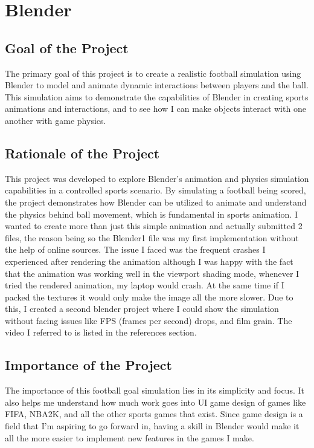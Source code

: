 \documentclass[ fontsize=11pt,twoside]{scrartcl}	%
\begin{document}
\clearpage

\section{Blender}
\subsection{Goal of the Project}
The primary goal of this project is to create a realistic football simulation using Blender to model and animate dynamic interactions between players and the ball. This simulation aims to demonstrate the capabilities of Blender in creating sports animations and interactions, and to see how I can make objects interact with one another with game physics.

\subsection{Rationale of the Project}
This project was developed to explore Blender's animation and physics simulation capabilities in a controlled sports scenario. By simulating a football being scored, the project demonstrates how Blender can be utilized to animate and understand the physics behind ball movement, which is fundamental in sports animation. I wanted to create more than just this simple animation and actually submitted 2 files, the reason being so the Blender1 file was my first implementation without the help of online sources. The issue I faced was the frequent crashes I experienced after rendering the animation although I was happy with the fact that the animation was working well in the viewport shading mode, whenever I tried the rendered animation, my laptop would crash. At the same time if I packed the textures it would only make the image all the more slower. Due to this, I created a second blender project where I could show the simulation without facing issues like FPS (frames per second) drops, and film grain. The video I referred to is listed in the references section. 

\subsection{Importance of the Project}
The importance of this football goal simulation lies in its simplicity and focus. It also helps me understand how much work goes into UI game design of games like FIFA, NBA2K, and all the other sports games that exist. Since game design is a field that I'm aspiring to go forward in, having a skill in Blender would make it all the more easier to implement new features in the games I make.
\end{document}
